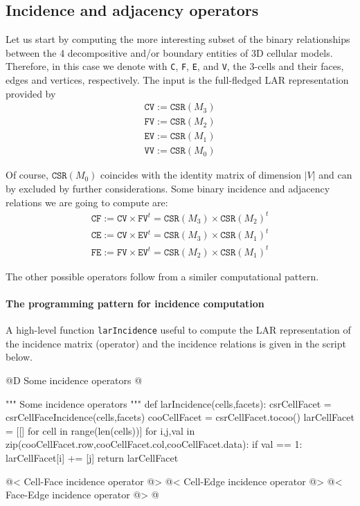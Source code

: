 \documentclass[11pt,oneside]{article}	%
\begin{document}
\subsection{Incidence and adjacency operators}

Let us start by computing the more interesting subset of the binary relationships between the 4 decompositive and/or boundary entities of 3D cellular models.  Therefore, in this case we denote with \texttt{C}, \texttt{F}, \texttt{E}, and \texttt{V}, the 3-cells and their faces, edges and vertices, respectively.
The input is the full-fledged LAR representation provided by 
\begin{align}
\texttt{CV} := \texttt{CSR}(M_3) \\
\texttt{FV} := \texttt{CSR}(M_2) \\
\texttt{EV} := \texttt{CSR}(M_1) \\
\texttt{VV} := \texttt{CSR}(M_0) 
\end{align}

Of course, $\texttt{CSR}(M_0)$ coincides with the identity matrix of dimension $|V|$ and can by excluded by further considerations.
Some binary incidence and adjacency relations we are going to compute are:
\begin{align}
\texttt{CF} := \texttt{CV} \times \texttt{FV}^t = \texttt{CSR}(M_3)\times\texttt{CSR}(M_2)^t \\
\texttt{CE} := \texttt{CV} \times \texttt{EV}^t = \texttt{CSR}(M_3)\times\texttt{CSR}(M_1)^t \\
\texttt{FE} := \texttt{FV} \times \texttt{EV}^t = \texttt{CSR}(M_2)\times\texttt{CSR}(M_1)^t 
\end{align}

The other possible operators follow from a similer computational pattern.

\paragraph{The programming pattern for incidence computation}

A high-level function \texttt{larIncidence} useful to compute the LAR representation of the incidence matrix (operator) and the incidence relations is given in the script below.

@D Some incidence operators
@{""" Some incidence operators """
def larIncidence(cells,facets):
	csrCellFacet = csrCellFaceIncidence(cells,facets)
	cooCellFacet = csrCellFacet.tocoo()
	larCellFacet = [[] for cell in range(len(cells))]
	for i,j,val in zip(cooCellFacet.row,cooCellFacet.col,cooCellFacet.data):
		if val == 1: larCellFacet[i] += [j]
	return larCellFacet

@< Cell-Face incidence operator @>
@< Cell-Edge incidence operator @>
@< Face-Edge incidence operator @>
@}
\end{document}
